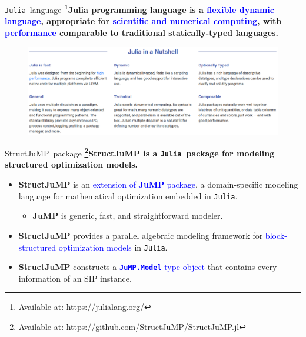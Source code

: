 \documentclass{beamer}
\newcommand{\jump}{\textsf{JuMP}}
\newcommand{\structjump}{\textsf{StructJuMP}}
\newcommand{\julia}{\texttt{Julia}}
\newcommand{\jumpmodel}{\texttt{JuMP.Model}}
\begin{document}
	\begin{frame}{\julia\ language}
	\textbf{\footnote{\tiny Available at: \href{https://julialang.org /}{https://julialang.org/}}{Julia programming language} is a \textcolor{blue}{flexible dynamic language}, appropriate for \textcolor{blue}{scientific and numerical computing}, with \textcolor{blue}{performance} comparable to traditional statically-typed languages.} 
		\begin{figure}
			\begin{center}
				\includegraphics[width=\textwidth]{julia_nutshell}
			\end{center}
		\end{figure}	
	\end{frame}

	\begin{frame}{\structjump\ package}
		\textbf{\footnote{\tiny Available at: \href{https://github.com/StructJuMP/StructJuMP.jl}{https://github.com/StructJuMP/StructJuMP.jl}}{\structjump} is a \julia\ package for modeling structured optimization models.}
		\begin{itemize}
			\item \textbf{\structjump} is an \textcolor{blue}{extension of \textbf{\jump} package}, a domain-specific modeling language for mathematical optimization embedded in \julia.
			\begin{itemize}
				\item \textbf{\jump} is generic, fast, and straightforward modeler.
			\end{itemize}
			\item \textbf{\structjump} provides a parallel algebraic modeling framework for \textcolor{blue}{block-structured optimization models} in \julia.
			\item \textbf{\structjump} constructs a \textcolor{blue}{\textbf{\jumpmodel}-type object} that contains every information of an SIP instance.
		\end{itemize}
	\end{frame}
\end{document}
